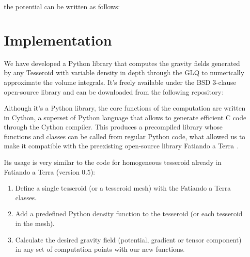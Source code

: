 \documentclass[extra]{gji}
\begin{document}
\noindent the potential can be written as follows:



\section{Implementation}

We have developed a Python library that computes the gravity fields generated by any Tesseroid with variable density in depth through the GLQ to numerically approximate the volume integrals.
It's freely available under the BSD 3-clause open-source library and can be downloaded from the following repository: 

Although it's a Python library, the core functions of the computation are written in Cython, a superset of Python language that allows to generate efficient C code through the Cython compiler.
This produces a precompiled library whose functions and classes can be called from regular Python code, what allowed us to make it compatible with the preexisting open-source library Fatiando a Terra \citep{Uieda2013}.

Its usage is very similar to the code for homogeneous tesseroid already in Fatiando a Terra (version 0.5):

\begin{enumerate}
\renewcommand{\theenumi}{(\arabic{enumi})}
    \item Define a single tesseroid (or a tesseroid mesh) with the Fatiando a Terra classes.
    \item Add a predefined Python density function to the tesseroid (or each tesseroid in the mesh).
    \item Calculate the desired gravity field (potential, gradient or tensor component) in any set of computation points with our new functions.
\end{enumerate}
\end{document}
